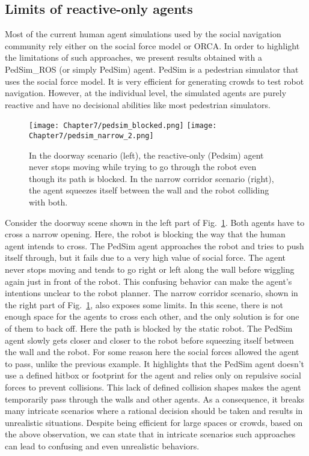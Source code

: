 \subsection{Limits of reactive-only agents}
\label{sec:pedsim_compare}
Most of the current human agent simulations used by the social navigation community rely either on the social force model or ORCA. In order to highlight the limitations of such approaches, we present results obtained with a PedSim\_ROS (or simply PedSim) agent. PedSim is a pedestrian simulator that uses the social force model. It is very efficient for generating crowds to test robot navigation. However, at the individual level, the simulated agents are purely reactive and have no decisional abilities like most pedestrian simulators. 

\begin{figure}
    \centering
    \texttt{[image: Chapter7/pedsim\_blocked.png]}
    \texttt{[image: Chapter7/pedsim\_narrow\_2.png]}
    \caption{
    In the doorway scenario (left), the reactive-only (Pedsim) agent never stops moving while trying to go through the robot even though its path is blocked. 
    In the narrow corridor scenario (right), the agent squeezes itself between the wall and the robot colliding with both. 
    }
    \label{fig:limits_reactive}
    \vspace{-0.3cm}
\end{figure}

Consider the doorway scene shown in the left part of Fig.~\ref{fig:limits_reactive}. Both agents have to cross a narrow opening. Here, the robot is blocking the way that the human agent intends to cross. The PedSim agent approaches the robot and tries to push itself through, but it fails due to a very high value of social force. The agent never stops moving and tends to go right or left along the wall before wiggling again just in front of the robot. 
This confusing behavior can make the agent's intentions unclear to the robot planner. 
The narrow corridor scenario, shown in the right part of Fig.~\ref{fig:limits_reactive}, also exposes some limits. In this scene, there is not enough space for the agents to cross each other,  and the only solution is for one of them to back off. Here the path is blocked by the static robot. The PedSim agent slowly gets closer and closer to the robot before squeezing itself between the wall and the robot. For some reason here the social forces allowed the agent to pass, unlike the previous example. It highlights that the PedSim agent doesn't use a defined hitbox or footprint for the agent and relies only on repulsive social forces to prevent collisions. This lack of defined collision shapes makes the agent temporarily pass through the walls and other agents. As a consequence, it breaks many intricate scenarios where a rational decision should be taken and results in unrealistic situations. Despite being efficient for large spaces or crowds, based on the above observation, we can state that in intricate scenarios such approaches can lead to confusing and even unrealistic behaviors.  

